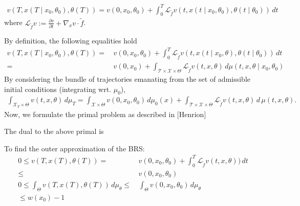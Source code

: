 \documentclass[10pt]{scrartcl}
\theoremstyle{remark}
\providecommand{\ip}[1]{\ensuremath \langle #1\rangle}
\begin{document}
\begin{align}
	v(T,x(T\mid x_0,\theta_0),\theta(T))=v(0,x_0,\theta_0)+\int_{0}^T \mathcal L_{\tilde f}v(t,x(t\mid x_0,\theta_0),\theta(t\mid \theta_0))\,dt
\end{align} 
where $\mathcal L_{\tilde f}v:=\frac{\partial v}{\partial t}+\nabla_x v \cdot \tilde f$.
\par
 By definition, the following equalities hold
\begin{align}
	v(T,x(T\mid x_0,\theta_0),\theta(T))=&\,v(0,x_0,\theta_0)+\int_{0}^T \mathcal L_{\tilde f}v(t,x(t\mid x_0,\theta),\theta(t\mid\theta_0))\,dt\\
	=&\,v(0,x_0)+\int_{\mathcal T\times \mathcal X\times \Theta}\mathcal L_{\tilde f}v(t,x,\theta)\,d\mu(t,x,\theta\mid x_0,\theta_0)
\end{align}
By considering the bundle of trajectories emanating from the set of admissible initial conditions (integrating wrt. $\mu_0$),
\begin{align}
	\int_{\mathcal X_T\times \Theta} v(t,x,\theta) \,d\mu_T=\int_{\mathcal X\times \Theta}v(0,x_0,\theta_0)\,d\mu_0(x)+\int_{\mathcal T\times \mathcal X\times \Theta} \mathcal L_{\tilde f}v(t,x,\theta)\,d\,\mu(t,x,\theta).
\end{align}
Now, we formulate the primal problem as described in [Henrion]
The dual to the above primal is 
To find the outer approximation of the BRS:
\begin{align}
0\le v(T,x(T),\theta(T))=&\,v(0,x_0,\theta_0)+\int_{0}^T\mathcal L_{\tilde f}v(t,x,\theta))\,dt\\
\le &\,v(0,x_0,\theta_0)\\
0\le \int_{\Theta}v(T,x(T),\theta(T))\,d\mu_\theta\le &\,\int_{\Theta}v(0,x_0,\theta_0)\,d\mu_\theta\\
\le w(x_0)-1
\end{align}
\newpage
\end{document}
